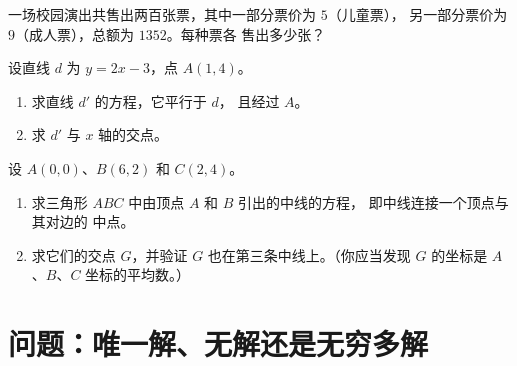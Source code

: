 \begin{exercise}[$\star\star$]\label{exo:g10:lines:8}
一场校园演出共售出两百张票，其中一部分票价为 $5$（儿童票），
另一部分票价为 $9$（成人票），总额为 $1352$。每种票各
售出多少张？
\end{exercise}

\begin{exercise}[$\star\star$]\label{exo:g10:lines:9}
设直线 $d$ 为 $y = 2x - 3$，点 $A(1, 4)$。
\begin{enumerate}
  \item 求直线 $d'$ 的方程，它平行于 $d$，
        且经过 $A$。
  \item 求 $d'$ 与 $x$ 轴的交点。
\end{enumerate}
\end{exercise}

\begin{exercise}[$\star\star\star$]\label{exo:g10:lines:10}
设 $A(0, 0)$、$B(6, 2)$ 和 $C(2, 4)$。
\begin{enumerate}
  \item 求三角形 $ABC$ 中由顶点 $A$ 和 $B$ 引出的中线的方程，
        即中线连接一个顶点与其对边的
        中点。
  \item 求它们的交点 $G$，并验证
        $G$ 也在第三条中线上。（你应当发现
        $G$ 的坐标是 $A$、$B$、$C$ 坐标的平均数。）
\end{enumerate}
\end{exercise}

\section{问题：唯一解、无解还是无穷多解}

